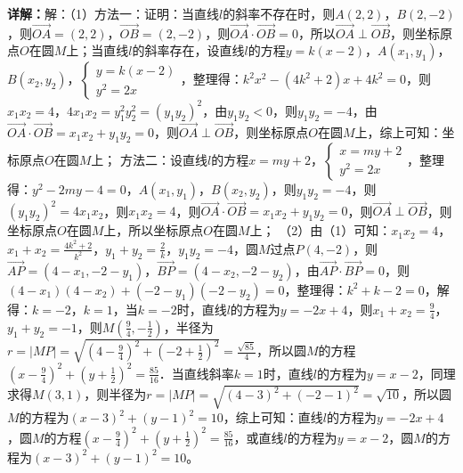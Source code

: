 \begin{question}[points=12]
\begin{solution}
\textbf{详解：}解：（1）方法一：证明：当直线$l$的斜率不存在时，则$A(2,2)$，$B(2,-2)$，则$\overrightarrow{OA}=(2,2)$，$\overrightarrow{OB}=(2,-2)$，则$\overrightarrow{OA}\cdot\overrightarrow{OB}=0$，所以$\overrightarrow{OA}\perp\overrightarrow{OB}$，则坐标原点$O$在圆$M$上；当直线$l$的斜率存在，设直线$l$的方程$y=k(x-2)$，$A(x_1,y_1)$，$B(x_2,y_2)$，$\begin{cases} y=k(x-2) \\ y^2=2x \end{cases}$，整理得：$k^2x^2-(4k^2+2)x+4k^2=0$，则$x_1x_2=4$，$4x_1x_2=y_1^2y_2^2=(y_1y_2)^2$，由$y_1y_2<0$，则$y_1y_2=-4$，由$\overrightarrow{OA}\cdot\overrightarrow{OB}=x_1x_2+y_1y_2=0$，则$\overrightarrow{OA}\perp\overrightarrow{OB}$，则坐标原点$O$在圆$M$上，综上可知：坐标原点$O$在圆$M$上；
方法二：设直线$l$的方程$x=my+2$，$\begin{cases} x=my+2 \\ y^2=2x \end{cases}$，整理得：$y^2-2my-4=0$，$A(x_1,y_1)$，$B(x_2,y_2)$，则$y_1y_2=-4$，则$(y_1y_2)^2=4x_1x_2$，则$x_1x_2=4$，则$\overrightarrow{OA}\cdot\overrightarrow{OB}=x_1x_2+y_1y_2=0$，则$\overrightarrow{OA}\perp\overrightarrow{OB}$，则坐标原点$O$在圆$M$上，所以坐标原点$O$在圆$M$上；
（2）由（1）可知：$x_1x_2=4$，$x_1+x_2=\frac{4k^2+2}{k^2}$，$y_1+y_2=\frac{2}{k}$，$y_1y_2=-4$，圆$M$过点$P(4,-2)$，则$\overrightarrow{AP}=(4-x_1,-2-y_1)$，$\overrightarrow{BP}=(4-x_2,-2-y_2)$，由$\overrightarrow{AP}\cdot\overrightarrow{BP}=0$，则$(4-x_1)(4-x_2)+(-2-y_1)(-2-y_2)=0$，整理得：$k^2+k-2=0$，解得：$k=-2$，$k=1$，当$k=-2$时，直线$l$的方程为$y=-2x+4$，则$x_1+x_2=\frac{9}{4}$，$y_1+y_2=-1$，则$M(\frac{9}{4},-\frac{1}{2})$，半径为$r=|MP|=\sqrt{(4-\frac{9}{4})^2+(-2+\frac{1}{2})^2}=\frac{\sqrt{85}}{4}$，所以圆$M$的方程$(x-\frac{9}{4})^2+(y+\frac{1}{2})^2=\frac{85}{16}$．当直线斜率$k=1$时，直线$l$的方程为$y=x-2$，同理求得$M(3,1)$，则半径为$r=|MP|=\sqrt{(4-3)^2+(-2-1)^2}=\sqrt{10}$，所以圆$M$的方程为$(x-3)^2+(y-1)^2=10$，综上可知：直线$l$的方程为$y=-2x+4$，圆$M$的方程$(x-\frac{9}{4})^2+(y+\frac{1}{2})^2=\frac{85}{16}$，或直线$l$的方程为$y=x-2$，圆$M$的方程为$(x-3)^2+(y-1)^2=10$。
\end{solution}
\end{question}

